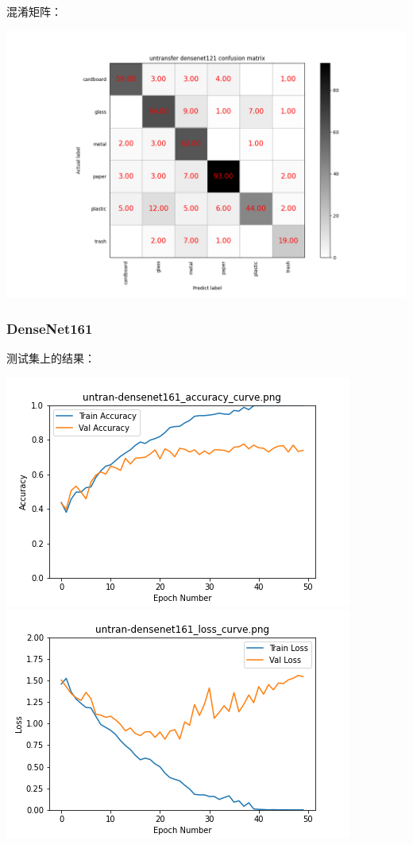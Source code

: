 \documentclass[UTF8]{ctexart}
\begin{document}
混淆矩阵：

\includegraphics[scale=0.5]{cm/undense121.png} 

\subsubsection{DenseNet161}

测试集上的结果：

\includegraphics[scale=0.5]{image/untran-densenet161_accuracy_curve.png} \includegraphics[scale=0.5]{image/untran-densenet161_loss_curve.png} 
\end{document}
